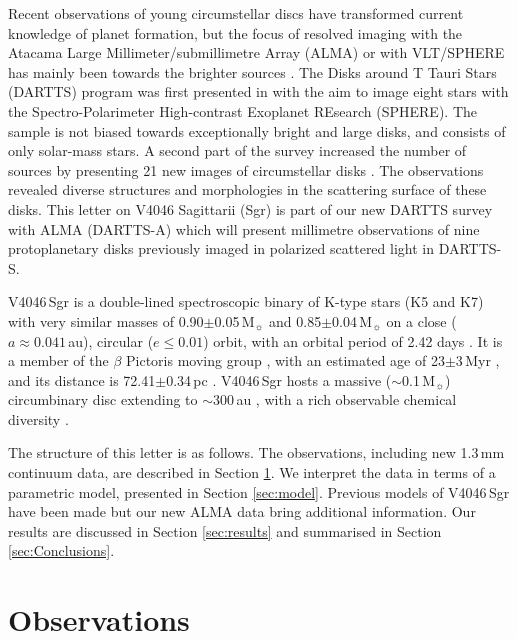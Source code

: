 \documentclass[letters,usenatbib,times]{mnras}
\begin{document}
Recent observations of young circumstellar discs have transformed current knowledge of planet formation, but the focus of resolved imaging with the Atacama Large Millimeter/submillimetre Array (ALMA) or with VLT/SPHERE has mainly been towards the brighter sources \citep{Andrews2020arXiv200105007A}. The Disks around T Tauri Stars (DARTTS) program was first presented in \citet{Avenhaus_2018} with the aim to image eight stars with the Spectro-Polarimeter High-contrast Exoplanet REsearch (SPHERE). The sample is not biased towards exceptionally bright and large disks, and consists of only solar-mass stars. A second part of the survey increased the number of sources by presenting 21 new images of circumstellar disks \citep{Garufi2020}. The observations revealed diverse structures and morphologies in the scattering surface of these disks. This letter on V4046 Sagittarii (Sgr) is part of our new DARTTS survey with ALMA (DARTTS-A) which will present millimetre observations of nine protoplanetary disks previously imaged in polarized scattered light in DARTTS-S. 

V4046\,Sgr is a double-lined spectroscopic binary of K-type stars (K5 and K7) with very similar masses of 0.90$\pm$0.05\,M$_{\sun}$ and 0.85$\pm$0.04\,M$_{\sun}$ \citep{Rosenfeld_2012} on a close ($a \approx 0.041$\,au), circular ($e\leq0.01$) orbit, with an orbital period of 2.42 days \citep{refId0}. It is a member of the $\beta$ Pictoris moving group \citep{Zuckerman_2004}, with an estimated age of 23$\pm$3\,Myr \citep{Mamajek_2014}, and its distance is 72.41$\pm$0.34\,pc \citep{Gaia}. V4046\,Sgr hosts a massive ($\sim$0.1\,M$_{\sun}$) circumbinary disc extending to $\sim$300\,au \citep{Rosenfeld_2013, Rodriguez_2010}, with a rich observable chemical diversity \citep{Kastner_2018}. 

The structure of this letter is as follows. The observations, including new 1.3\,mm continuum data, are described in Section \ref{sec:Observations}. We interpret the data in terms of a parametric model, presented in Section \ref{sec:model}. Previous models of V4046\,Sgr have been made \citep{Ru_z_Rodr_guez_2019, Rosenfeld_2013, 2019ApJ...882..160Q} but our new ALMA data bring additional information. Our results are discussed in Section \ref{sec:results} and summarised in Section \ref{sec:Conclusions}.

\section{Observations} \label{sec:Observations}
\end{document}
